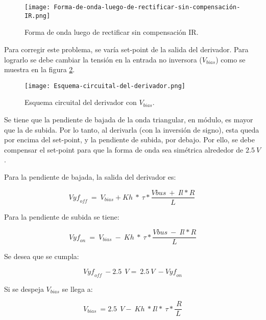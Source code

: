 \begin{figure}[H]
	\centering
	\texttt{[image: Forma-de-onda-luego-de-rectificar-sin-compensación-IR.png]}
	\caption{Forma de onda luego de rectificar sin compensación IR.}
	\label{fig:img_Forma-de-onda-luego-de-rectificar-sin-compensación-IR}
\end{figure}

\noindent Para corregir este problema, se varía set-point de la salida del derivador. Para lograrlo se debe cambiar la tensi\'{o}n en la entrada no inversora ($V_{bias}$) como se muestra en la figura \ref{fig:img_Esquema-circuital-del-derivador}. 

\begin{figure}[H]
	\centering
	\texttt{[image: Esquema-circuital-del-derivador.png]}
	\caption{Esquema circuital del derivador con $V_{bias}$.}
	\label{fig:img_Esquema-circuital-del-derivador}
\end{figure}

\noindent Se tiene que la pendiente de bajada de la onda triangular, en m\'{o}dulo, es mayor que la de subida. Por lo tanto, al derivarla (con la inversi\'{o}n de signo), esta queda por encima del set-point, y la pendiente de subida, por debajo. Por ello, se debe compensar el set-point para que la forma de onda sea sim\'{e}trica alrededor de $2.5\:V$. 

\noindent Para la pendiente de bajada, la salida del derivador es:

\begin{equation} \label{eq_Vyf-Vbias}
	{Vyf}_{off}\ =\ V_{bias}+Kh\ *\ \tau *\frac{Vbus\ +\ Il*R}{L}\ 
\end{equation}

\noindent Para la pendiente de subida se tiene:

\begin{equation} \label{eq_Vyf-Vbias2}
	{Vyf}_{on}\ =\ V_{bias}\ -\ Kh\ *\ \tau *\frac{Vbus\ -\ Il*R}{L}
\end{equation}

\noindent Se desea que se cumpla:

\begin{equation} \label{eq_Vyf_Vbias3}
	{Vyf}_{off}\ -2.5\ \:V=\ 2.5\ V\ -{Vyf}_{on}
\end{equation}

\noindent Si se despeja $V_{bias}$ se llega a:

\begin{equation} \label{eq_Vyf-Vbias4}
	V_{bias}\ =2.5\ \:V -\ Kh\ *Il*\ \tau *\frac{\ R}{L}
\end{equation}


